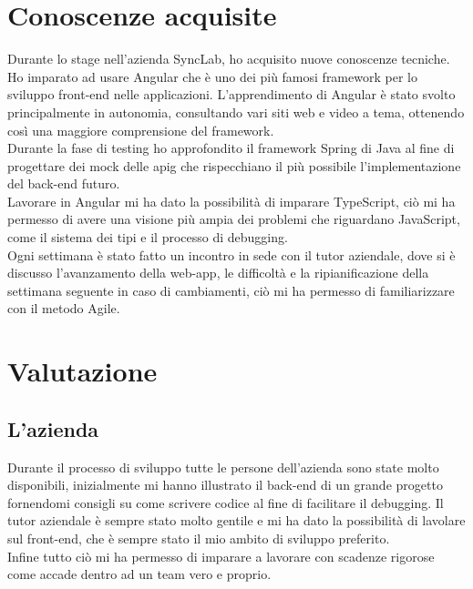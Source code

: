 \section{Conoscenze acquisite}
Durante lo stage nell'azienda SyncLab, ho acquisito nuove conoscenze tecniche.\\
Ho imparato ad usare Angular che è uno dei più famosi framework per lo sviluppo front-end nelle applicazioni. L'apprendimento di Angular è stato svolto principalmente in autonomia, consultando vari siti web e video a tema, ottenendo così una maggiore comprensione del framework.\\
Durante la fase di testing ho approfondito il framework Spring di Java al fine di progettare dei mock delle \gls{apig} che rispecchiano il più possibile l'implementazione del back-end futuro.\\
Lavorare in Angular mi ha dato la possibilità di imparare TypeScript, ciò mi ha permesso di avere una visione più ampia dei problemi che riguardano JavaScript, come il sistema dei tipi e il processo di debugging.\\
Ogni settimana è stato fatto un incontro in sede con il tutor aziendale, dove si è discusso l'avanzamento della web-app, le difficoltà e la ripianificazione della settimana seguente in caso di cambiamenti, ciò mi ha permesso di familiarizzare con il metodo Agile.\\

\section{Valutazione}
\subsection{L'azienda}
Durante il processo di sviluppo tutte le persone dell'azienda sono state molto disponibili, inizialmente mi hanno illustrato il back-end di un grande progetto fornendomi consigli su come scrivere codice al fine di facilitare il debugging. Il tutor aziendale è sempre stato molto gentile e mi ha dato la possibilità di lavolare sul front-end, che è sempre stato il mio ambito di sviluppo preferito.\\
Infine tutto ciò mi ha permesso di imparare a lavorare con scadenze rigorose come accade dentro ad un team vero e proprio.\\
